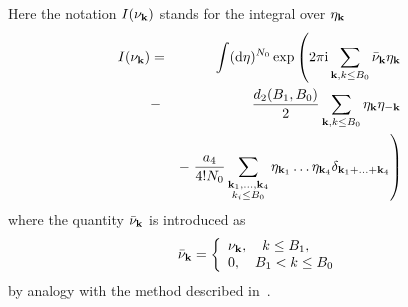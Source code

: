 Here the notation $I(\nu_{\vb k})$ stands for the integral over $\eta_{\vb k}$
\begin{eqnarray*}
	I(\nu_{\vb k}) & = & \int ({\rm d} \eta)^{N_0} \exp
	\left( 2\pi{\rm i} \sum_{\vb k, k \leq B_0} \bar{\nu}_{\vb k} \eta_{\vb k} 
	\right.
	\\
	&-& \left. \frac{d_2(B_1, B_0)}{2} \sum_{\vb k, k \leq B_0} \eta_{\vb k} \eta_{-\vb k}
	\right.
	\\
	&& - \left. \frac{a_4}{4! N_0} \sum_{\substack{\vb k_1, \dotsc, \vb k_4 \\ k_i \leq B_0}} \eta_{\vb k_1} \dotsc \eta_{\vb k_4} \delta_{\vb{k}_1 + \dotsc + \vb{k}_4} \right)
\end{eqnarray*}
where the quantity $\bar{\nu}_{\vb k}$ is introduced as
\begin{equation*}
	\bar{\nu}_{\vb k} = \left\{
	\begin{array}{ll}
		\nu_{\vb k}, \quad k \leq B_1, \\
		0, \quad B_1 < k \leq B_0
	\end{array}
	\right.
\end{equation*}
by analogy with the method described in~\cite{MpkCMP2005}.


